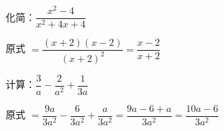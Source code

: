 \documentclass[a4paper,12pt]{ctexart}
\begin{document}


\begin{example}
化简：$\dfrac{x^2-4}{x^2+4x+4}$
\end{example}
\begin{solution}
原式 $=\dfrac{(x+2)(x-2)}{(x+2)^2}=\dfrac{x-2}{x+2}$
\end{solution}

\begin{example}
计算：$\dfrac{3}{a}-\dfrac{2}{a^2}+\dfrac{1}{3a}$
\end{example}
\begin{solution}
原式 $=\dfrac{9a}{3a^2}-\dfrac{6}{3a^2}+\dfrac{a}{3a^2}=\dfrac{9a-6+a}{3a^2}=\dfrac{10a-6}{3a^2}$
\end{solution}

\end{document}
